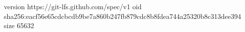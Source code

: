 version https://git-lfs.github.com/spec/v1
oid sha256:eacf56e65cdcbcdb9be7a860b247fb879cdc8b8fdea744a25320b8c313dee394
size 65632
